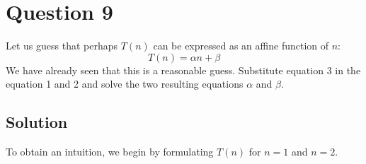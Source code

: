 
\section*{Question 9}

Let us guess that perhaps $T(n)$ can be expressed as an affine function of $n$:
\begin{equation}
T(n) = \alpha n + \beta
\end{equation}
We have already seen that this is a reasonable guess.
Substitute equation 3 in the equation 1 and 2 and solve the two resulting equations $\alpha$ and $\beta$.

\subsection*{Solution}

To obtain an intuition, we begin by formulating $T(n)$ for $n = 1$ and $n=2$.


